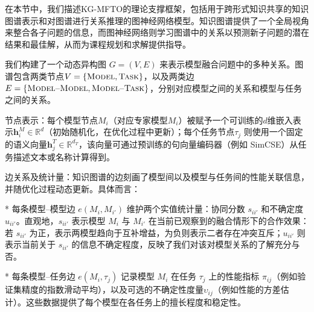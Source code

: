 \documentclass[../main.tex]{subfiles}
\begin{document}
\label{sec:ch5-4-kg-driven-theoretical-framework}

在本节中，我们描述KG-MFTO的理论支撑框架，包括用于跨形式知识共享的知识图谱表示和对图谱进行关系推理的图神经网络模型。知识图谱提供了一个全局视角来整合各子问题的信息，而图神经网络则学习图谱中的关系以预测新子问题的潜在结果和最佳解，从而为课程规划和求解提供指导。

\label{sec:ch5-4-1-dynamic-heterogeneous-kg-modeling}

我们构建了一个动态异构图 $G=(V,E)$ 来表示模型融合问题中的多种关系。图谱包含两类节点$V=\{\textsc{Model}, \textsc{Task}\}$，以及两类边$E=\{\textsc{Model--Model}, \textsc{Model--Task}\}$，分别对应模型之间的关系和模型与任务之间的关系。

节点表示：每个模型节点$M_i$（对应专家模型$M_i$）被赋予一个可训练的$d$维嵌入表示$\mathbf{h}^M_i \in \mathbb{R}^d$（初始随机化，在优化过程中更新）；每个任务节点$\tau_j$ 则使用一个固定的语义向量$\mathbf{h}^T_j \in \mathbb{R}^{d_T}$，该向量可通过预训练的句向量编码器（例如 SimCSE\cite{gao2021simcse}）从任务描述文本或名称计算得到。

边关系及统计量：知识图谱的边刻画了模型间以及模型与任务间的性能关联信息，并随优化过程动态更新。具体而言：

* 每条模型--模型边 $e(M_i, M_{i'})$ 维护两个实值统计量：协同分数 $s_{ii'}$ 和不确定度 $u_{ii'}$。直观地，$s_{ii'}$ 表示模型 $M_i$ 与 $M_{i'}$ 在当前已观察到的融合情形下的合作效果：若 $s_{ii'}$ 为正，表示两模型趋向于互补增益，为负则表示二者存在冲突互斥；$u_{ii'}$ 则表示当前关于 $s_{ii'}$ 的信息不确定程度，反映了我们对该对模型关系的了解充分与否。

* 每条模型--任务边 $e(M_i, \tau_j)$ 记录模型 $M_i$ 在任务 $\tau_j$ 上的性能指标 $\pi_{ij}$（例如验证集精度的指数滑动平均），以及可选的不确定性度量$\upsilon_{ij}$（例如性能的方差估计）。这些数据提供了每个模型在各任务上的擅长程度和稳定性。
\end{document}
